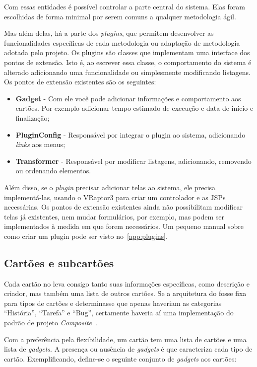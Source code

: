 Com essas entidades é possível controlar a parte central do sistema. Elas foram escolhidas de forma minimal por serem comuns a qualquer metodologia ágil. 

Mas além delas, há a parte dos \textit{plugins}, que permitem desenvolver as funcionalidades específicas de cada metodologia ou adaptação de metodologia adotada pelo projeto. Os plugins são classes que implementam uma interface dos pontos de extensão. Isto é, ao escrever essa classe, o comportamento do sistema é alterado adicionando uma funcionalidade ou simplesmente modificando listagens. Os pontos de extensão existentes são os seguintes:

\begin{itemize}
	\item{\textbf{Gadget} - Com ele você pode adicionar informações e comportamento aos cartões. Por exemplo adicionar tempo estimado de execução e data de início e finalização;}
	\item{\textbf{PluginConfig} - Responsável por integrar o plugin ao sistema, adicionando \textit{links} aos menus;}
	\item{\textbf{Transformer} - Responsável por modificar listagens, adicionando, removendo ou ordenando elementos.}
\end{itemize}

Além disso, se o \textit{plugin} precisar adicionar telas ao sistema, ele precisa implementá-las, usando o VRaptor3 para criar um controlador e as JSPs necessárias. Os pontos de extensão existentes ainda não possibilitam modificar telas já existentes, nem mudar formulários, por exemplo, mas podem ser implementados à medida em que forem necessários. Um pequeno manual sobre como criar um plugin pode ser visto no~\ref{app:plugins}.

\subsection{Cartões e subcartões}

Cada cartão no \calopsita{} leva consigo tanto suas informações específicas, como descrição e criador, mas também uma lista de outros cartões. Se a arquitetura do \calopsita{} fosse fixa para tipos de cartões e determinasse que apenas haveriam as categorias ``História'', ``Tarefa'' e ``Bug'', certamente haveria aí uma implementação do padrão de projeto \textit{Composite}~\cite{gof}.

Com a preferência pela flexibilidade, um cartão tem uma lista de cartões e uma lista de \textit{gadgets}. A presença ou ausência de \textit{gadgets} é que caracteriza cada tipo de cartão. Exemplificando, define-se o seguinte conjunto de \textit{gadgets} aos cartões:

